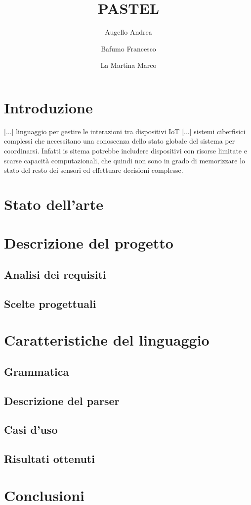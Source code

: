 \documentclass[]{article}
\title{PASTEL}
\author{{Augello Andrea} \and {Bafumo Francesco} \and{La Martina Marco}}
\begin{document}
\maketitle

\section{Introduzione}

{[...]} linguaggio per gestire le interazioni tra dispositivi IoT [...] sistemi ciberfisici complessi che necessitano una conoscenza dello stato globale del sistema per coordinarsi. Infatti is sitema potrebbe includere dispositivi con risorse limitate e scarse capacità computazionali, che quindi non sono in grado di memorizzare lo stato del resto dei sensori ed effettuare decisioni complesse.

\nocite{gaglio2017dc4cd}

\section{Stato dell'arte}
\lipsum[2]
\nocite{libes1991expect, libes1990expect}

\section{Descrizione del progetto}
\lipsum[3]
\subsection{Analisi dei requisiti}
\subsection{Scelte progettuali}
\section{Caratteristiche del linguaggio}
\subsection{Grammatica}
\subsection{Descrizione del parser}
\subsection{Casi d'uso}
\subsection{Risultati ottenuti}
\section{Conclusioni}






\end{document}
